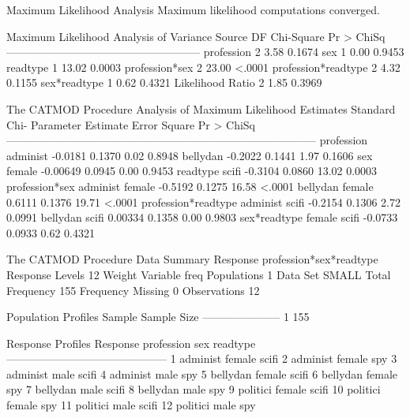\documentclass{article}
\begin{document}
\begin{Woutput}
                   Maximum Likelihood Analysis
           Maximum likelihood computations converged.

       Maximum Likelihood Analysis of Variance
Source                  DF   Chi-Square    Pr > ChiSq
-----------------------------------------------------
profession               2         3.58        0.1674
sex                      1         0.00        0.9453
readtype                 1        13.02        0.0003
profession*sex           2        23.00        <.0001
profession*readtype      2         4.32        0.1155
sex*readtype             1         0.62        0.4321
Likelihood Ratio         2         1.85        0.3969

The CATMOD Procedure
                      Analysis of Maximum Likelihood Estimates
                                                  Standard        Chi-
Parameter                              Estimate      Error      Square    Pr > ChiSq
------------------------------------------------------------------------------------
profession          administ            -0.0181     0.1370        0.02        0.8948
                    bellydan            -0.2022     0.1441        1.97        0.1606
sex                 female             -0.00649     0.0945        0.00        0.9453
readtype            scifi               -0.3104     0.0860       13.02        0.0003
profession*sex      administ female     -0.5192     0.1275       16.58        <.0001
                    bellydan female      0.6111     0.1376       19.71        <.0001
profession*readtype administ scifi      -0.2154     0.1306        2.72        0.0991
                    bellydan scifi      0.00334     0.1358        0.00        0.9803
sex*readtype        female scifi        -0.0733     0.0933        0.62        0.4321

The CATMOD Procedure
                           Data Summary
Response           profession*sex*readtype     Response Levels   12
Weight Variable    freq                        Populations        1
Data Set           SMALL                       Total Frequency  155
Frequency Missing  0                           Observations      12

 Population Profiles
Sample    Sample Size
---------------------
    1             155

             Response Profiles
Response    profession    sex       readtype
--------------------------------------------
    1       administ      female    scifi
    2       administ      female    spy
    3       administ      male      scifi
    4       administ      male      spy
    5       bellydan      female    scifi
    6       bellydan      female    spy
    7       bellydan      male      scifi
    8       bellydan      male      spy
    9       politici      female    scifi
   10       politici      female    spy
   11       politici      male      scifi
   12       politici      male      spy


\end{Woutput}
\end{document}
